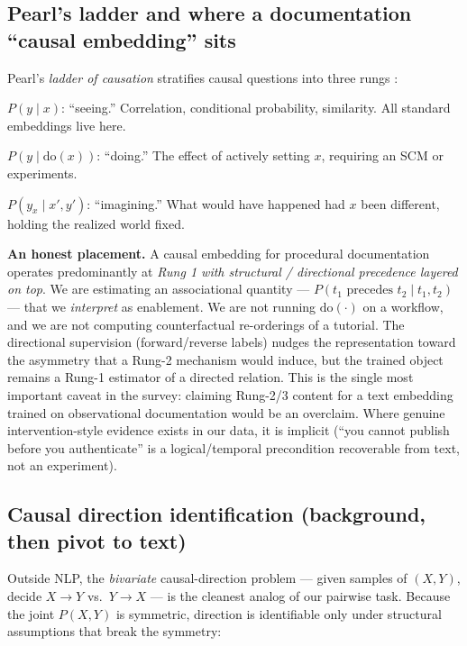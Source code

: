 \subsection{Pearl's ladder and where a documentation ``causal embedding'' sits}
\label{sec:ladder}

Pearl's \emph{ladder of causation} stratifies causal questions into three rungs
\citep{found:pearl2009causality,found:pearl2018book}:

\begin{description}[leftmargin=1.2em,itemsep=2pt]
  \item[Rung 1 --- Association] $P(y\mid x)$: ``seeing.'' Correlation,
  conditional probability, similarity. All standard embeddings live here.
  \item[Rung 2 --- Intervention] $P(y\mid \mathrm{do}(x))$: ``doing.'' The effect
  of actively setting $x$, requiring an SCM or experiments.
  \item[Rung 3 --- Counterfactual] $P(y_x\mid x',y')$: ``imagining.'' What would
  have happened had $x$ been different, holding the realized world fixed.
\end{description}

\noindent\textbf{An honest placement.}
A causal embedding for procedural documentation operates predominantly at
\emph{Rung 1 with structural / directional precedence layered on top}. We are
estimating an associational quantity --- $P(\text{$t_1$ precedes $t_2$}\mid
t_1,t_2)$ --- that we \emph{interpret} as enablement. We are not running
$\mathrm{do}(\cdot)$ on a workflow, and we are not computing counterfactual
re-orderings of a tutorial. The directional supervision (forward/reverse labels)
nudges the representation toward the asymmetry that a Rung-2 mechanism would
induce, but the trained object remains a Rung-1 estimator of a directed relation.
This is the single most important caveat in the survey: claiming Rung-2/3
content for a text embedding trained on observational documentation would be an
overclaim. Where genuine intervention-style evidence exists in our data, it is
implicit (``you cannot publish before you authenticate'' is a logical/temporal
precondition recoverable from text, not an experiment).

\subsection{Causal direction identification (background, then pivot to text)}
\label{sec:direction-id}

Outside NLP, the \emph{bivariate} causal-direction problem --- given samples of
$(X,Y)$, decide $X\to Y$ vs.\ $Y\to X$ --- is the cleanest analog of our pairwise
task. Because the joint $P(X,Y)$ is symmetric, direction is identifiable only
under structural assumptions that break the symmetry:


